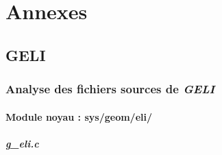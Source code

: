 \chapter{Annexes}

\section{GELI}
\subsection{Analyse des fichiers sources de \em GELI}
\subsubsection{Module noyau : sys/geom/eli/}
\paragraph{g\_eli.c}
